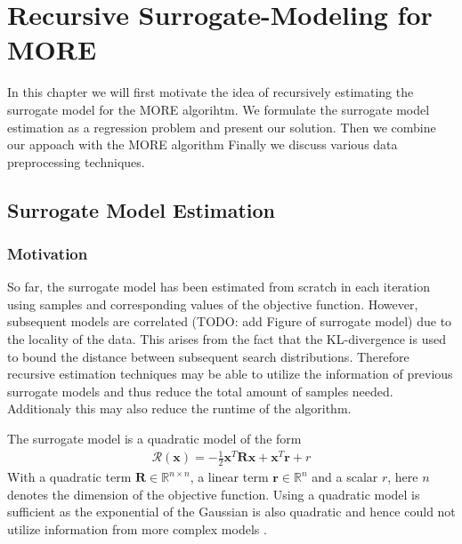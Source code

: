 
\chapter{Recursive Surrogate-Modeling for MORE}
In this chapter we will first motivate the idea of recursively
estimating the surrogate model for the MORE algorihtm.
We formulate the surrogate model estimation
as a regression problem and present our solution.
Then we combine our appoach with the MORE algorithm
Finally we discuss various data preprocessing techniques.

\section{Surrogate Model Estimation}

\subsection{Motivation}
So far, the surrogate model has been estimated from scratch in each
iteration using samples and corresponding
values of the objective function. 
However, subsequent models are correlated
(TODO: add Figure of surrogate model) due to the locality of the
data. This arises from the fact that the KL-divergence is
used to bound the distance between
subsequent search distributions. Therefore recursive estimation
techniques may be able to utilize the information of previous
surrogate models and thus reduce the total amount of samples needed.
Additionaly this may also reduce the runtime of the algorithm.

The surrogate model is a quadratic model of the form
\begin{align}
  \label{surrogate}
  \mathcal{R}(\mathbf{x}) = -\frac{1}{2} \mathbf{x}^T \mathbf{R} \mathbf{x}
  + \mathbf{x}^T \mathbf{r} + r 
\end{align}
With a quadratic term $\mathbf{R} \in \mathbb{R}^{n \times n}$,
a linear term $\mathbf{r} \in \mathbb{R}^{n}$ and a scalar $r$,
here $n$ denotes the dimension of the objective function.
Using a quadratic model is sufficient as the exponential of the
Gaussian is also quadratic and hence could not utilize information
from more complex models \citep{abdolmaleki2015model}.



